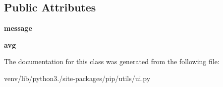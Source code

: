 \subsection*{Public Attributes}
\begin{DoxyCompactItemize}
\item 
\mbox{\label{classpip_1_1utils_1_1ui_1_1_download_progress_mixin_a7124de29c44397da1a193e53b38560cb}} 
{\bfseries message}
\item 
\mbox{\label{classpip_1_1utils_1_1ui_1_1_download_progress_mixin_a3d26237be828c08282476a470c55828b}} 
{\bfseries avg}
\end{DoxyCompactItemize}


The documentation for this class was generated from the following file\+:\begin{DoxyCompactItemize}
\item 
venv/lib/python3./site-\/packages/pip/utils/ui.\+py\end{DoxyCompactItemize}
